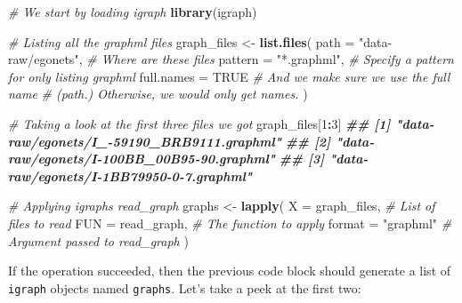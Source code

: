 \documentclass[
]{book}
\newenvironment{Shaded}{\begin{snugshade}}{\end{snugshade}}
\newcommand{\AttributeTok}[1]{\textcolor[rgb]{0.13,0.29,0.53}{#1}}
\newcommand{\CommentTok}[1]{\textcolor[rgb]{0.56,0.35,0.01}{\textit{#1}}}
\newcommand{\ConstantTok}[1]{\textcolor[rgb]{0.56,0.35,0.01}{#1}}
\newcommand{\DecValTok}[1]{\textcolor[rgb]{0.00,0.00,0.81}{#1}}
\newcommand{\DocumentationTok}[1]{\textcolor[rgb]{0.56,0.35,0.01}{\textbf{\textit{#1}}}}
\newcommand{\FunctionTok}[1]{\textcolor[rgb]{0.13,0.29,0.53}{\textbf{#1}}}
\newcommand{\NormalTok}[1]{#1}
\newcommand{\OtherTok}[1]{\textcolor[rgb]{0.56,0.35,0.01}{#1}}
\newcommand{\SpecialCharTok}[1]{\textcolor[rgb]{0.81,0.36,0.00}{\textbf{#1}}}
\newcommand{\StringTok}[1]{\textcolor[rgb]{0.31,0.60,0.02}{#1}}
\begin{document}
\begin{Shaded}
\begin{Highlighting}[]
\CommentTok{\# We start by loading igraph}
\FunctionTok{library}\NormalTok{(igraph)}

\CommentTok{\# Listing all the graphml files}
\NormalTok{graph\_files }\OtherTok{\textless{}{-}} \FunctionTok{list.files}\NormalTok{(}
  \AttributeTok{path       =} \StringTok{"data{-}raw/egonets"}\NormalTok{, }\CommentTok{\# Where are these files}
  \AttributeTok{pattern    =} \StringTok{"*.graphml"}\NormalTok{,        }\CommentTok{\# Specify a pattern for only listing graphml}
  \AttributeTok{full.names =} \ConstantTok{TRUE}                \CommentTok{\# And we make sure we use the full name}
                                   \CommentTok{\# (path.) Otherwise, we would only get names.}
\NormalTok{  )}

\CommentTok{\# Taking a look at the first three files we got}
\NormalTok{graph\_files[}\DecValTok{1}\SpecialCharTok{:}\DecValTok{3}\NormalTok{]}
\DocumentationTok{\#\# [1] "data{-}raw/egonets/I\_{-}59190\_BRB9111.graphml"}
\DocumentationTok{\#\# [2] "data{-}raw/egonets/I{-}100BB\_00B95{-}90.graphml"}
\DocumentationTok{\#\# [3] "data{-}raw/egonets/I{-}1BB79950{-}0{-}7.graphml"}

\CommentTok{\# Applying igraph\textquotesingle{}s read\_graph}
\NormalTok{graphs }\OtherTok{\textless{}{-}} \FunctionTok{lapply}\NormalTok{(}
  \AttributeTok{X      =}\NormalTok{ graph\_files,       }\CommentTok{\# List of files to read}
  \AttributeTok{FUN    =}\NormalTok{ read\_graph,        }\CommentTok{\# The function to apply}
  \AttributeTok{format =} \StringTok{"graphml"}          \CommentTok{\# Argument passed to read\_graph}
\NormalTok{  )}
\end{Highlighting}
\end{Shaded}

If the operation succeeded, then the previous code block should generate a list of \texttt{igraph} objects named \texttt{graphs}. Let's take a peek at the first two:
\end{document}
